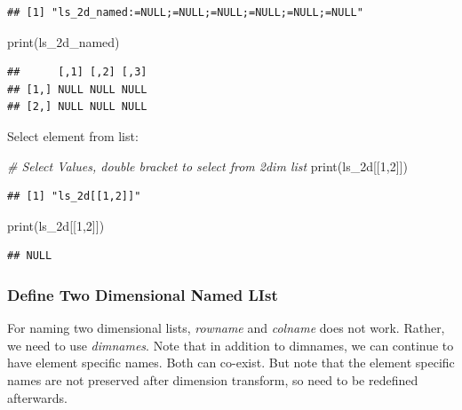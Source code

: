 \documentclass[
]{book}
\newenvironment{Shaded}{\begin{snugshade}}{\end{snugshade}}
\newcommand{\CommentTok}[1]{\textcolor[rgb]{0.56,0.35,0.01}{\textit{#1}}}
\newcommand{\DecValTok}[1]{\textcolor[rgb]{0.00,0.00,0.81}{#1}}
\newcommand{\FunctionTok}[1]{\textcolor[rgb]{0.00,0.00,0.00}{#1}}
\newcommand{\NormalTok}[1]{#1}
\newcommand{\StringTok}[1]{\textcolor[rgb]{0.31,0.60,0.02}{#1}}
\begin{document}
\begin{verbatim}
## [1] "ls_2d_named:=NULL;=NULL;=NULL;=NULL;=NULL;=NULL"
\end{verbatim}

\begin{Shaded}
\begin{Highlighting}[]
\FunctionTok{print}\NormalTok{(ls\_2d\_named)}
\end{Highlighting}
\end{Shaded}

\begin{verbatim}
##      [,1] [,2] [,3]
## [1,] NULL NULL NULL
## [2,] NULL NULL NULL
\end{verbatim}

Select element from list:

\begin{Shaded}
\begin{Highlighting}[]
\CommentTok{\# Select Values, double bracket to select from 2dim list}
\FunctionTok{print}\NormalTok{(}\StringTok{\textquotesingle{}ls\_2d[[1,2]]\textquotesingle{}}\NormalTok{)}
\end{Highlighting}
\end{Shaded}

\begin{verbatim}
## [1] "ls_2d[[1,2]]"
\end{verbatim}

\begin{Shaded}
\begin{Highlighting}[]
\FunctionTok{print}\NormalTok{(ls\_2d[[}\DecValTok{1}\NormalTok{,}\DecValTok{2}\NormalTok{]])}
\end{Highlighting}
\end{Shaded}

\begin{verbatim}
## NULL
\end{verbatim}

\hypertarget{define-two-dimensional-named-list}{%
\subsubsection{Define Two Dimensional Named LIst}\label{define-two-dimensional-named-list}}

For naming two dimensional lists, \emph{rowname} and \emph{colname} does not work. Rather, we need to use \emph{dimnames}. Note that in addition to dimnames, we can continue to have element specific names. Both can co-exist. But note that the element specific names are not preserved after dimension transform, so need to be redefined afterwards.
\end{document}
